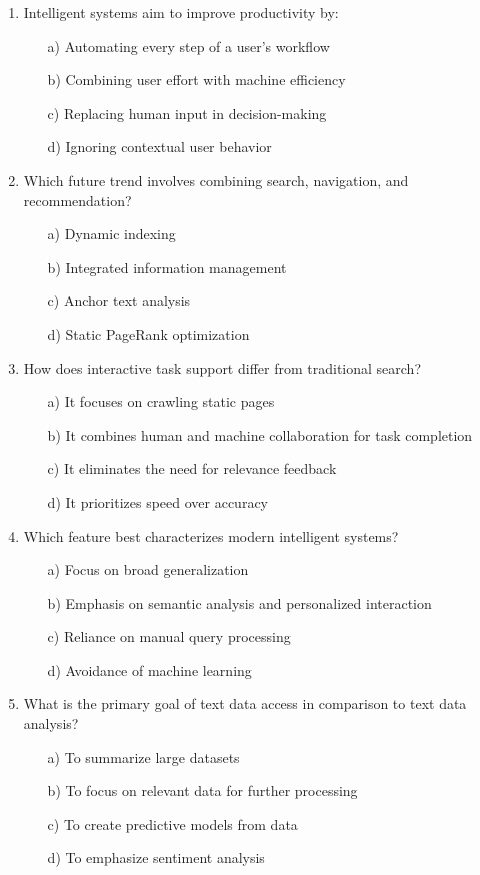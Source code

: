 \documentclass[8pt]{extarticle}
\begin{document}
\begin{multicols}{2}
\begin{enumerate}
\item Intelligent systems aim to improve productivity by:
\begin{itemize}
\item[a)] Automating every step of a user's workflow
\item[b)] Combining user effort with machine efficiency
\item[c)] Replacing human input in decision-making
\item[d)] Ignoring contextual user behavior
\end{itemize}

\item Which future trend involves combining search, navigation, and recommendation?
\begin{itemize}
\item[a)] Dynamic indexing
\item[b)] Integrated information management
\item[c)] Anchor text analysis
\item[d)] Static PageRank optimization
\end{itemize}

\item How does interactive task support differ from traditional search?
\begin{itemize}
\item[a)] It focuses on crawling static pages
\item[b)] It combines human and machine collaboration for task completion
\item[c)] It eliminates the need for relevance feedback
\item[d)] It prioritizes speed over accuracy
\end{itemize}

\item Which feature best characterizes modern intelligent systems?
\begin{itemize}
\item[a)] Focus on broad generalization
\item[b)] Emphasis on semantic analysis and personalized interaction
\item[c)] Reliance on manual query processing
\item[d)] Avoidance of machine learning
\end{itemize}

\item What is the primary goal of text data access in comparison to text data analysis?
\begin{itemize}
\item[a)] To summarize large datasets
\item[b)] To focus on relevant data for further processing
\item[c)] To create predictive models from data
\item[d)] To emphasize sentiment analysis
\end{itemize}


\end{enumerate}
\end{multicols}
\end{document}

